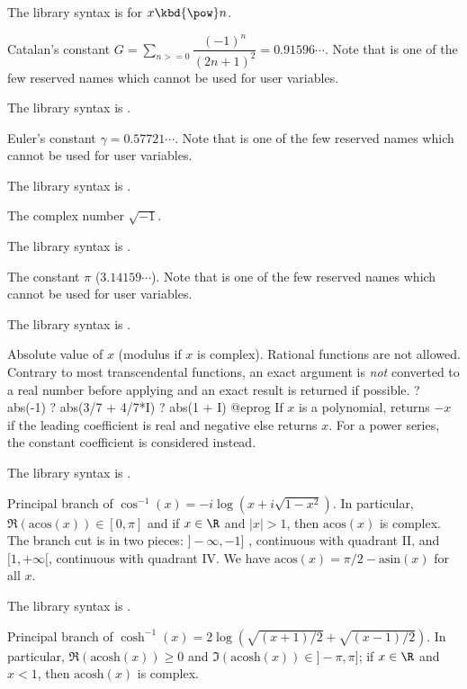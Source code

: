 The library syntax is 
for $x\hbox{\kbd{\pow}}n$.


\label{se:Catalan}
Catalan's constant $G = \sum_{n>=0}\dfrac{(-1)^n}{(2n+1)^2}=0.91596\cdots$.
Note that  is one of the few reserved names which cannot be
used for user variables.

The library syntax is .

\label{se:Euler}
Euler's constant $\gamma=0.57721\cdots$. Note that
 is one of the few reserved names which cannot be used for
user variables.

The library syntax is .

\label{se:I}
The complex number $\sqrt{-1}$.

The library syntax is .

\label{se:Pi}
The constant $\pi$ ($3.14159\cdots$). Note that  is one of the few
reserved names which cannot be used for user variables.

The library syntax is .

\label{se:abs}
Absolute value of $x$ (modulus if $x$ is complex).
Rational functions are not allowed. Contrary to most transcendental
functions, an exact argument is \emph{not} converted to a real number before
applying  and an exact result is returned if possible.
\bprog
? abs(-1)
? abs(3/7 + 4/7*I)
? abs(1 + I)
@eprog\noindent
If $x$ is a polynomial, returns $-x$ if the leading coefficient is
real and negative else returns $x$. For a power series, the constant
coefficient is considered instead.

The library syntax is .

\label{se:acos}
Principal branch of $\cos^{-1}(x) = -i \log (x + i\sqrt{1-x^2})$.
In particular, $\Re(\text{acos}(x))\in [0,\pi]$ and if $x\in \R$ and $|x|>1$,
then $\text{acos}(x)$ is complex. The branch cut is in two pieces:
$]-\infty,-1]$ , continuous with quadrant II, and $[1,+\infty[$, continuous
with quadrant IV. We have $\text{acos}(x) = \pi/2 - \text{asin}(x)$ for all
$x$.

The library syntax is .

\label{se:acosh}
Principal branch of $\cosh^{-1}(x) = 2
 \log(\sqrt{(x+1)/2} + \sqrt{(x-1)/2})$. In particular,
$\Re(\text{acosh}(x))\geq 0$ and
$\Im(\text{acosh}(x))\in ]-\pi,\pi]$; if $x\in \R$ and $x<1$, then
$\text{acosh}(x)$ is complex.

